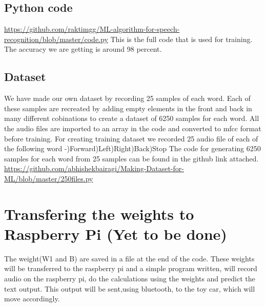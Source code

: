 \documentclass[a4paper,12pt]{article}
\begin{document}
\subsection{Python code}

\url{https://github.com/raktimgg/ML-algorithm-for-speech-recognition/blob/master/code.py}\newline
This is the full code that is used for training. The accuracy we are getting is around 98 percent.

\subsection{Dataset}
We have made our own dataset by recording 25 samples of each word. Each of these samples are recreated by adding empty elements in the front and back in many different cobinations to create a dataset of 6250 samples for each word. All the audio files are imported to an array in the code and converted to mfcc format before training. For creating training dataset we recorded 25 audio file of each of the following word -)Forward)Left)Right)Back)Stop\newline
The code for generating 6250 samples for each word from 25 samples can be found in the github link attached.\newline
\url{https://github.com/abhishekbairagi/Making-Dataset-for-ML/blob/master/250files.py}



\section{Transfering the weights to Raspberry Pi (Yet to be done)}
The weight(W1 and B) are saved in a file at the end of the code. These weights will be transferred to the raspberry pi and a simple program written, will record audio on the raspberry pi, do the calculations using the weights and predict the text output. This output will be sent,using bluetooth, to the toy car, which will move accordingly.
\end{document}

